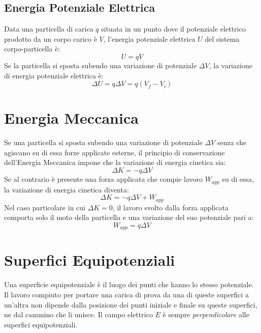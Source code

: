             \subsection{Energia Potenziale Elettrica} Data una particella di 
            carica $q$ situata in un punto dove il potenziale elettrico 
            prodotto da un corpo carico è $V$, l'energia potenziale elettrica
            $U$ del sistema corpo-particella è:
                \begin{equation}
                    U = qV
                \end{equation}
            Se la particella si sposta subendo una variazione di potenziale 
            $\Delta V$, la variazione di energia potenziale elettrica è:
                \begin{equation}
                    \Delta U = q \Delta V = q (V_f - V_i)
                \end{equation}
            
        \section{Energia Meccanica} Se una particella si sposta subendo una 
        variazione di potenziale $\Delta V$ senza che agiscano su di essa forze
        applicate esterne, il principio di conservazione dell'Energia Meccanica
        impone che la variazione di energia cinetica sia:
            \begin{equation}
                \Delta K = -q \Delta V
            \end{equation}
        Se al contrario è presente una forza applicata che compie lavoro 
        $W_{app}$ su di essa, la variazione di energia cinetica diventa:
            \begin{equation}
                \Delta K = -q\Delta V + W_{app}
            \end{equation}
        Nel caso particolare in cui $\Delta K = 0$, il lavoro svolto dalla 
        forza applicata comporta solo il moto della particella e una variazione
        del suo potenziale pari a:
            \begin{equation}
                W_{app} = q \Delta V
            \end{equation}

        \section{Superfici Equipotenziali} Una superficie equipotenziale è il 
        luogo dei punti che hanno lo stesso potenziale. Il lavoro compiuto per
        portare una carica di prova da una di queste superfici a un'altra non 
        dipende dalla posizione dei punti iniziale e finale su queste 
        superfici, ne dal cammino che li unisce. Il campo elettrico $E$ è 
        sempre \textit{perpendicolare} alle superfici equipotenziali.

